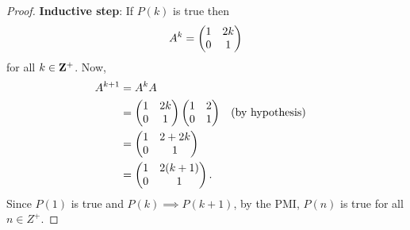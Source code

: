 \begin{parts}
\begin{EnvFullwidth}
\begin{solutionorgrid}[4.5in]
\begin{proof}
\textbf{Inductive step}: If $P(k)$ is true then
\[
    A^k =
    \begin{pmatrix}
        1 & 2k \\
        0 & 1
    \end{pmatrix}
\]
for all $k \in \mathbf{Z}^+$. Now,
\begin{align*}
    A^{k + 1} &= A^kA \\
    &=
    \begin{pmatrix}
        1 & 2k \\
        0 & 1
    \end{pmatrix}
    \begin{pmatrix}
        1 & 2 \\
        0 & 1
    \end{pmatrix} && (\textrm{by hypothesis}) \\
    &=
    \begin{pmatrix}
        1 & 2 + 2k \\
        0 & 1
    \end{pmatrix} \\
    &=
    \begin{pmatrix}
        1 & 2(k + 1) \\
        0 & 1
    \end{pmatrix}.
\end{align*}
Since $P(1)$ is true and $P(k) \implies P(k + 1)$, by the PMI, $P(n)$ is true for all $n \in Z^+$.
\end{proof}
\end{solutionorgrid}
\end{EnvFullwidth}

\end{parts}
